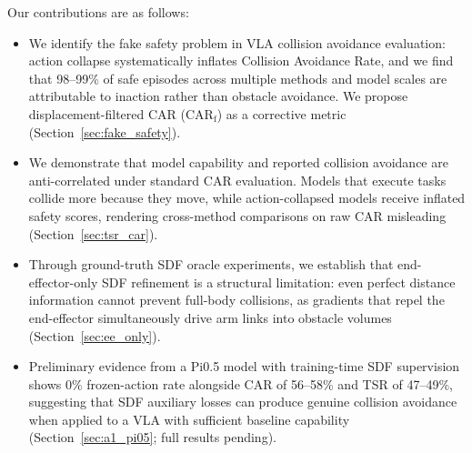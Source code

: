 Our contributions are as follows:
\begin{itemize}
    \item We identify the fake safety problem in VLA collision avoidance evaluation: action collapse systematically inflates Collision Avoidance Rate, and we find that 98--99\% of safe episodes across multiple methods and model scales are attributable to inaction rather than obstacle avoidance. We propose displacement-filtered CAR (CAR$_\text{f}$) as a corrective metric (Section~\ref{sec:fake_safety}).
    \item We demonstrate that model capability and reported collision avoidance are anti-correlated under standard CAR evaluation. Models that execute tasks collide more because they move, while action-collapsed models receive inflated safety scores, rendering cross-method comparisons on raw CAR misleading (Section~\ref{sec:tsr_car}).
    \item Through ground-truth SDF oracle experiments, we establish that end-effector-only SDF refinement is a structural limitation: even perfect distance information cannot prevent full-body collisions, as gradients that repel the end-effector simultaneously drive arm links into obstacle volumes (Section~\ref{sec:ee_only}).
    \item[\textbf{[C4]}] Preliminary evidence from a Pi0.5 model with training-time SDF supervision shows 0\% frozen-action rate alongside CAR of 56--58\% and TSR of 47--49\%, suggesting that SDF auxiliary losses can produce genuine collision avoidance when applied to a VLA with sufficient baseline capability (Section~\ref{sec:a1_pi05}; full results pending).
\end{itemize}
